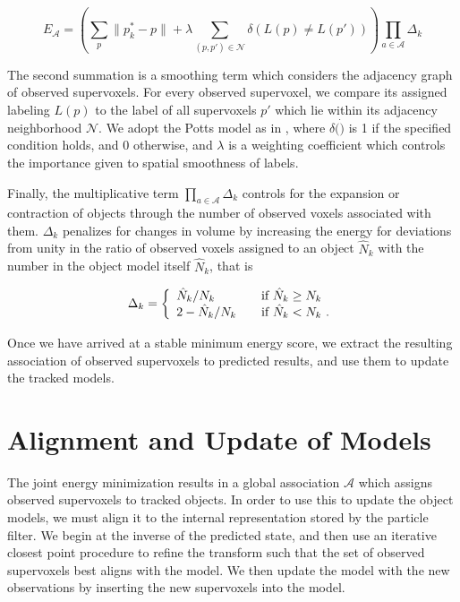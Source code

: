 \begin{equation}
\label{eqn:Energy}
{E}_\mathcal{A} = \left( \sum_{p}{\|p^*_k - p\|} + \lambda \sum_{(p,p')\in \mathcal{N} }\delta(L(p) \not= L(p')) \right) \prod_{a\in\mathcal{A}}{\Delta_k}
\end{equation}

The second summation is a smoothing term which considers the adjacency graph of observed supervoxels. For every observed supervoxel, we compare its assigned labeling $L(p)$ to the label of all supervoxels $p'$ which lie within its adjacency neighborhood $\mathcal{N}$. We adopt the Potts model as in \cite{Boykov2001}, where $\delta(\dot)$ is 1 if the specified condition holds, and 0 otherwise, and $\lambda$ is a weighting coefficient which controls the importance given to spatial smoothness of labels.

Finally, the multiplicative term $\prod_{a\in\mathcal{A}}{\Delta_k}$ controls for the expansion or contraction of objects through the number of observed voxels associated with them. $\Delta_k$ penalizes for changes in volume by increasing the energy for deviations from unity in the ratio of observed voxels assigned to an object $\hat{N}_k$ with the number in the object model itself $\hat{N}_k$, that is

\begin{equation}
\label{eqn:DeltaSVs}
\Delta_k = \left\{ 
  \begin{array}{l l}
    {\hat{N}_k}/{N_k} & \quad \text{if ${\hat{N}_k} \geq {{N}_k}$ }\\
    2 - {\hat{N}_k}/{N_k} & \quad \text{if $\hat{N}_k < {N}_k$}~. 
  \end{array} \right.  
\end{equation}

Once we have arrived at a stable minimum energy score, we extract the resulting association of observed supervoxels to predicted results, and use them to update the tracked models.

\section{Alignment and Update of Models}
The joint energy minimization results in a global association $\mathcal{A}$ which assigns observed supervoxels to tracked objects. In order to use this to update the object models, we must align it to the internal representation stored by the particle filter. We begin at the inverse of the predicted state, and then use an iterative closest point \cite{ICPChetverikov} procedure to refine the transform such that the set of observed supervoxels best aligns with the model. We then update the model with the new observations by inserting the new supervoxels into the model. 

